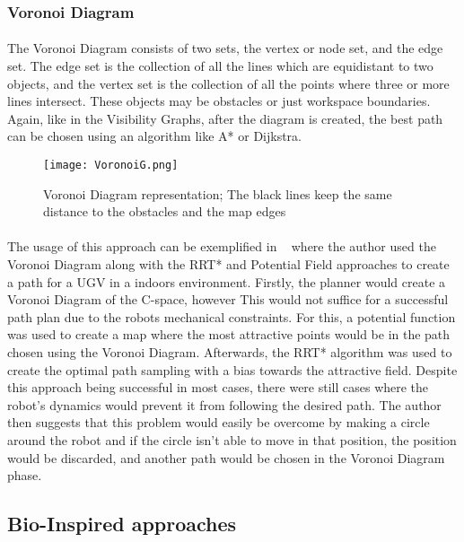 \subsubsection{Voronoi Diagram}
\label{subsubsec:VD}
\paragraph{}The Voronoi Diagram consists of two sets, the vertex or node set, and the edge set. The edge set is the collection of all the lines 
which are equidistant to two objects, and the vertex set is the collection of all the points where three or more lines intersect. These objects
may be obstacles or just workspace boundaries. Again, like in the Visibility Graphs, after the diagram is created, the best path can be chosen using
an algorithm like A* or Dijkstra.

\begin{figure}
    \centering
    \texttt{[image: VoronoiG.png]}
    \caption{Voronoi Diagram representation; The black lines keep the same distance to the obstacles and the map edges}
    \label{fig:VoronoiG}
\end{figure}

\paragraph{}The usage of this approach can be exemplified in ~\cite{8948325} where the author used the Voronoi Diagram along with the RRT* and Potential Field
approaches to create a path for a \gls{UGV} in a indoors environment. Firstly, the planner would create a Voronoi Diagram of the C-space, however This
would not suffice for a successful path plan due to the robots mechanical constraints. For this, a potential function was used to create a map
where the most attractive points would be in the path chosen using the Voronoi Diagram. Afterwards, the RRT* algorithm was used to create the
optimal path sampling with a bias towards the attractive field. Despite this approach being successful in most cases, there were still cases where
the robot's dynamics would prevent it from following the desired path. The author then suggests that this problem would easily be overcome by
making a circle around the robot and if the circle isn't able to move in that position, the position would be discarded, and another path would be chosen
in the Voronoi Diagram phase.

\subsection{Bio-Inspired approaches}
\label{subsec:BI}

